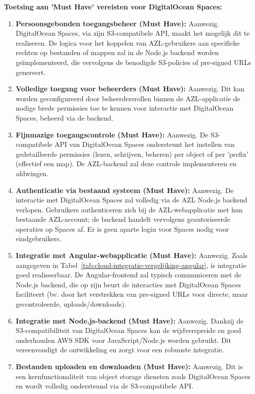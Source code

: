 \textbf{Toetsing aan 'Must Have' vereisten voor DigitalOcean Spaces:}
\begin{enumerate}
    \item \textbf{Persoonsgebonden toegangsbeheer (Must Have):} Aanwezig. DigitalOcean Spaces, via zijn S3-compatibele API, maakt het mogelijk dit te realiseren. De logica voor het koppelen van AZL-gebruikers aan specifieke rechten op bestanden of mappen zal in de Node.js backend worden geïmplementeerd, die vervolgens de benodigde S3-policies of pre-signed URLs genereert.
    \item \textbf{Volledige toegang voor beheerders (Must Have):} Aanwezig. Dit kan worden geconfigureerd door beheerdersrollen binnen de AZL-applicatie de nodige brede permissies toe te kennen voor interactie met DigitalOcean Spaces, beheerd via de backend.
    \item \textbf{Fijnmazige toegangscontrole (Must Have):} Aanwezig. De S3-compatibele API van DigitalOcean Spaces ondersteunt het instellen van gedetailleerde permissies (lezen, schrijven, beheren) per object of per 'prefix' (effectief een map). De AZL-backend zal deze controle implementeren en afdwingen.
    \item \textbf{Authenticatie via bestaand systeem (Must Have):} Aanwezig. De interactie met DigitalOcean Spaces zal volledig via de AZL Node.js backend verlopen. Gebruikers authenticeren zich bij de AZL-webapplicatie met hun bestaande AZL-account; de backend handelt vervolgens geautoriseerde operaties op Spaces af. Er is geen aparte login voor Spaces nodig voor eindgebruikers.
    \item \textbf{Integratie met Angular-webapplicatie (Must Have):} Aanwezig. Zoals aangegeven in Tabel~\ref{tab:cloud-integratie-vergelijking-angular}, is integratie goed realiseerbaar. De Angular-frontend zal typisch communiceren met de Node.js backend, die op zijn beurt de interacties met DigitalOcean Spaces faciliteert (bv. door het verstrekken van pre-signed URLs voor directe, maar gecontroleerde, uploads/downloads).
    \item \textbf{Integratie met Node.js-backend (Must Have):} Aanwezig. Dankzij de S3-compatibiliteit van DigitalOcean Spaces kan de wijdverspreide en goed onderhouden AWS SDK voor JavaScript/Node.js worden gebruikt. Dit vereenvoudigt de ontwikkeling en zorgt voor een robuuste integratie.
    \item \textbf{Bestanden uploaden en downloaden (Must Have):} Aanwezig. Dit is een kernfunctionaliteit van object storage diensten zoals DigitalOcean Spaces en wordt volledig ondersteund via de S3-compatibele API.

\end{enumerate}

